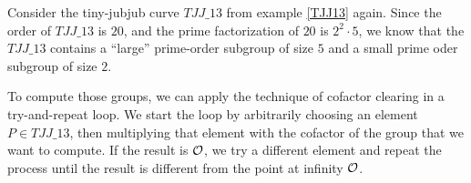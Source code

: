 \begin{example}\label{ex:TJJ13-cofactor-clearing} Consider the tiny-jubjub curve $\mathit{TJJ\_13}$ from example \ref{TJJ13} again. Since the order of $\mathit{TJJ\_13}$ is $20$, and the prime factorization of $20$ is $2^2\cdot 5$, we know that the $\mathit{TJJ\_13}$ contains a ``large'' prime-order subgroup of size $5$ and a small prime oder subgroup of size $2$. 

To compute those groups, we can apply the technique of cofactor clearing in a try-and-repeat loop. We start the loop by arbitrarily choosing an element $P\in \mathit{TJJ\_13}$, then multiplying that element with the cofactor of the group that we want to compute. If the result is $\mathcal{O}$, we try a different element and repeat the process until the result is different from the point at infinity $\mathcal{O}$.  


\end{example}

